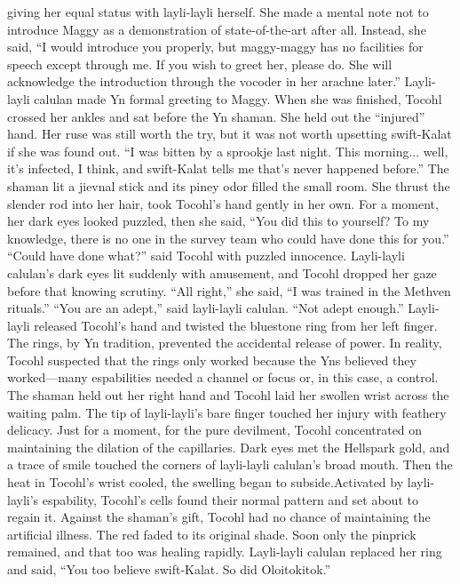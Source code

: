 \documentclass[9pt]{article}
\begin{document}
giving her equal status with layli-layli herself. She made a mental note not to introduce Maggy as a
demonstration of state-of-the-art after all.
Instead, she said, “I would introduce you properly, but maggy-maggy has no facilities for speech
except through me. If you wish to greet her, please do. She will acknowledge the introduction through the
vocoder in her arachne later.”
Layli-layli calulan made Yn formal greeting to Maggy.
When she was finished, Tocohl crossed her ankles and sat before the Yn shaman. She held out the
“injured” hand. Her ruse was still worth the try, but it was not worth upsetting swift-Kalat if she was
found out. “I was bitten by a sprookje last night. This morning... well, it’s infected, I think, and
swift-Kalat tells me that’s never happened before.”
The shaman lit a jievnal stick and its piney odor filled the small room. She thrust the slender rod into
her hair, took Tocohl’s hand gently in her own. For a moment, her dark eyes looked puzzled, then she
said, “You did this to yourself? To my knowledge, there is no one in the survey team who could have
done this for you.”
“Could have done what?” said Tocohl with puzzled innocence.
Layli-layli calulan’s dark eyes lit suddenly with amusement, and Tocohl dropped her gaze before
that knowing scrutiny. “All right,” she said, “I was trained in the Methven rituals.”
“You are an adept,” said layli-layli calulan.
“Not adept enough.”
Layli-layli released Tocohl’s hand and twisted the bluestone ring from her left finger. The rings, by
Yn tradition, prevented the accidental release of power. In reality, Tocohl suspected that the rings only
worked because the Yns believed they worked—many espabilities needed a channel or focus or, in this
case, a control.
The shaman held out her right hand and Tocohl laid her swollen wrist across the waiting palm. The tip
of layli-layli’s bare finger touched her injury with feathery delicacy.
Just for a moment, for the pure devilment, Tocohl concentrated on maintaining the dilation of the
capillaries. Dark eyes met the Hellspark gold, and a trace of smile touched the corners of layli-layli
calulan’s broad mouth. Then the heat in Tocohl’s wrist cooled, the swelling began to subside.Activated by layli-layli’s espability, Tocohl’s cells found their normal pattern and set about to regain
it. Against the shaman’s gift, Tocohl had no chance of maintaining the artificial illness.
The red faded to its original shade. Soon only the pinprick remained, and that too was healing
rapidly.
Layli-layli calulan replaced her ring and said, “You too believe swift-Kalat. So did Oloitokitok.”
\end{document}
